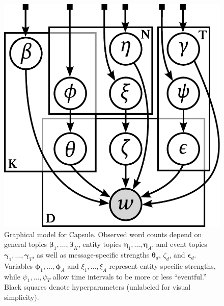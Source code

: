 \begin{figure}[bt]
\centering
\includegraphics[width=0.5\linewidth]{fig/graphicalmodel.pdf}
\caption{Graphical model for Capsule. Observed word counts depend on
  general topics $\mathbold{\beta}_1, \ldots, \mathbold{\beta}_K$,
  entity topics $\mathbold{\eta}_1, \ldots, \mathbold{\eta}_A$, and
  event topics $\mathbold{\gamma}_1, \ldots, \mathbold{\gamma}_T$, as
  well as message-specific strengths $\mathbold{\theta}_d$, $\zeta_d$,
  and $\mathbold{\epsilon}_d$.  Variables $\mathbold{\phi}_1, \ldots,
  \mathbold{\phi}_A$ and $\xi_1, \ldots, \xi_A$ represent
  entity-specific strengths, while $\psi_1, \ldots, \psi_T$ allow time
  intervals to be more or less ``eventful.'' Black squares denote
  hyperparameters (unlabeled for visual simplicity).}
\label{fig:graphicalmodel}
\end{figure}

